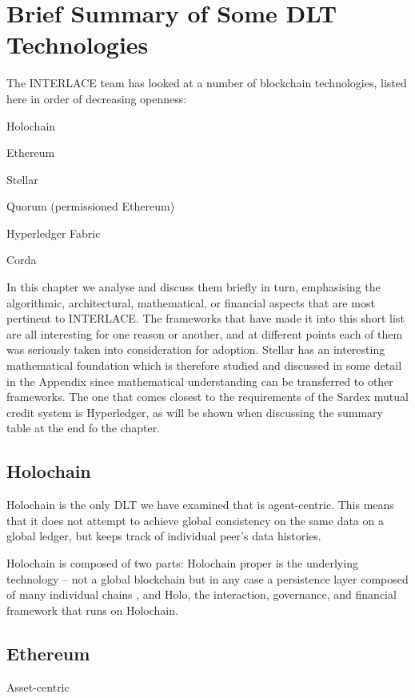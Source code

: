\section{Brief Summary of Some DLT Technologies}

The INTERLACE team has looked at a number of blockchain technologies, listed here in order of decreasing openness:
\begin{packed_item1}
\item Holochain
\item Ethereum
\item Stellar
\item Quorum (permissioned Ethereum)
\item Hyperledger Fabric
\item Corda
\end{packed_item1}
In this chapter we analyse and discuss them briefly in turn, emphasising the algorithmic, architectural,  mathematical, or financial aspects that are most pertinent to INTERLACE. The frameworks that have made it into this short list are all interesting for one reason or another, and at different points each of them was seriously taken into consideration for adoption. Stellar has an interesting mathematical foundation which is therefore studied and discussed in some detail in the Appendix since mathematical understanding can be transferred to other frameworks. The one that comes closest to the requirements of the Sardex mutual credit system is Hyperledger, as will be shown when discussing the summary table at the end fo the chapter.


\subsection{Holochain}
Holochain is the only DLT we have examined that is agent-centric. This means that it does not attempt to achieve global consistency on the same data on a global ledger, but keeps track of individual peer's data histories.

Holochain is composed of two parts: Holochain proper is the underlying technology -- not a global blockchain but in any case a persistence layer composed of many individual chains \cite{HarrisBrownEtAl2018}, and Holo, the interaction, governance, and financial framework that runs on Holochain.


\subsection{Ethereum}
Asset-centric



